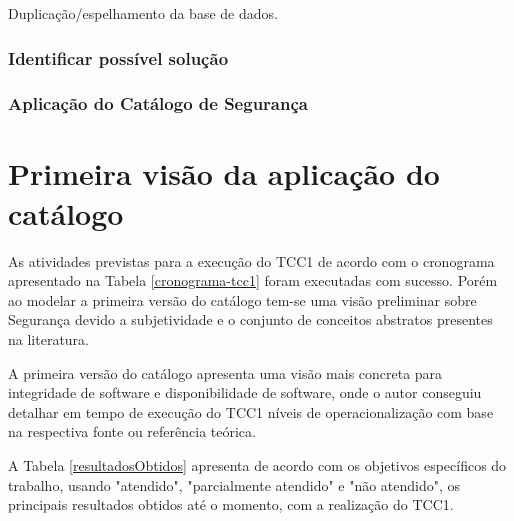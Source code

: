 Duplicação/espelhamento da base de dados. 

\subsubsection{Identificar possível solução}

\subsubsection{Aplicação do Catálogo de Segurança}


\section{Primeira visão da aplicação do catálogo}
\label{sec: aplicacaoDoCatalogo}
As atividades previstas para a execução do TCC1 de acordo com o cronograma apresentado na Tabela \ref{cronograma-tcc1} foram executadas com sucesso. Porém ao modelar a primeira versão do catálogo tem-se uma visão preliminar sobre Segurança devido a subjetividade e o conjunto de conceitos abstratos presentes na literatura.

A primeira versão do catálogo apresenta uma visão mais concreta para integridade de software e disponibilidade de software, onde o autor conseguiu detalhar em tempo de execução do TCC1 níveis de operacionalização com base na respectiva fonte ou referência teórica.

A Tabela \ref{resultadosObtidos} apresenta de acordo com os objetivos específicos do trabalho, usando "atendido", "parcialmente atendido" e "não atendido", os principais resultados obtidos até o momento, com a realização do TCC1.

